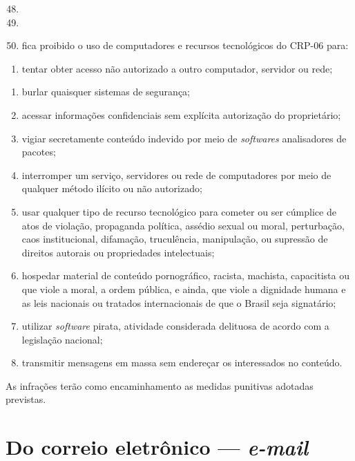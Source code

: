 \documentclass[openright, twoside, a4paper]{memoir}
\begin{document}
\begin{enumerate}

\setcounter{enumi}{47}
\item
\item
\item
    fica proibido o uso de computadores e recursos tecnológicos do CRP-06
    para:
\end{enumerate}

\begin{enumerate}
\def\labelenumi{\roman{enumi}.}
\item
    tentar obter acesso não autorizado a outro computador, servidor ou
    rede;
\end{enumerate}

\begin{enumerate}
\def\labelenumi{\roman{enumi}.}
\setcounter{enumi}{7}
\item
    burlar quaisquer sistemas de segurança;
\item
    acessar informações confidenciais sem explícita autorização do
    proprietário;
\item
    vigiar secretamente conteúdo indevido por meio de \emph{softwares}
    analisadores de pacotes;
\item
    interromper um serviço, servidores ou rede de computadores por meio de
    qualquer método ilícito ou não autorizado;
\item
    usar qualquer tipo de recurso tecnológico para cometer ou ser cúmplice
    de atos de violação, propaganda política, assédio sexual ou moral,
    perturbação, caos institucional, difamação, truculência, manipulação,
    ou supressão de direitos autorais ou propriedades intelectuais;
\item
    hospedar material de conteúdo pornográfico, racista, machista,
    capacitista ou que viole a moral, a ordem pública, e ainda, que viole
    a dignidade humana e as leis nacionais ou tratados internacionais de
    que o Brasil seja signatário;
\item
    utilizar \emph{software} pirata, atividade considerada delituosa de
    acordo com a legislação nacional;
\item
    transmitir mensagens em massa sem endereçar os interessados no
    conteúdo.
\end{enumerate}

As infrações terão como encaminhamento as medidas punitivas adotadas
previstas.

\clearpage\chapter{\texorpdfstring{Do correio eletrônico ---
\emph{e-mail}}{Do correio eletrônico --- e-mail}}
\end{document}
